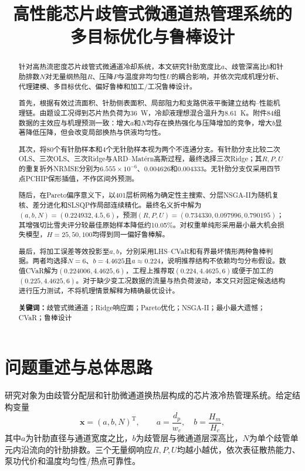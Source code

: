 \documentclass[UTF8,12pt,a4paper]{ctexart}
\title{\bfseries 高性能芯片歧管式微通道热管理系统的\\多目标优化与鲁棒设计}
\author{}
\date{}
\begin{document}
\maketitle
\vspace{-2.6em}

\begin{abstract}
针对高热流密度芯片歧管式微通道冷却系统，本文研究针肋宽度比$a$、歧管深高比$b$和针肋排数$N$对无量纲热阻$R$、压降$P$与温度非均匀性$U$的耦合影响，并依次完成机理分析、代理建模、多目标优化、偏好鲁棒和加工/工况鲁棒设计。

首先，根据有效过流面积、针肋侧表面积、局部阻力和支路供液平衡建立结构--性能机理链。由题设工况得到芯片热负荷为\SI{36}{W}，冷却液理想混合温升为\SI{8.61}{K}。附件84组数据的主效应与机理预测一致：增大$a$和$N$均存在换热强化与压降增加的竞争，增大$b$显著降低压降，但会改变局部换热与供液均匀性。

其次，将80个有针肋样本和4个无针肋样本视为两个不连通分支。有针肋分支比较二次OLS、三次OLS、三次Ridge与ARD--Mat\'ern高斯过程，最终选择三次Ridge；其$R,P,U$的重复折外NRMSE分别为$6.555\times10^{-6}$、0.004626和0.004333。无针肋分支仅采用四节点PCHIP保形插值，不作区间外预测。

随后，在Pareto偏序意义下，以401层析网格为确定性主搜索、分层NSGA-II为随机复核、差分进化和SLSQP作局部连续精化。最终名义折中解为$(a,b,N)=(0.224932,4.5,6)$，预测$(R,P,U)=(0.734330,0.097996,0.790195)$；其增强切比雪夫评分较最佳原始样本降低约10.05\%。对权重单纯形采用最小最大机会损失模型，$H=25,50,100$均得到同一偏好鲁棒解。

最后，将加工误差等效投影至$a,b$，分别采用LHS--CVaR和有界最坏情形两种鲁棒判据。两者均选择$N=6$、$b=4.4625$且$a\approx0.224$，说明推荐结构不依赖均匀分布假设。数值CVaR解为$(0.224006,4.4625,6)$，工程上推荐取$(0.224,4.4625,6)$或便于加工的$(0.225,4.4625,6)$。对于缺少变工况数据的流量与热负荷波动，本文只对固定候选结构进行压力测试，不将机理情景解释为精确最优设计。

\textbf{关键词：}歧管式微通道；Ridge响应面；Pareto优化；NSGA-II；最小最大遗憾；CVaR；鲁棒设计
\end{abstract}

\section{问题重述与总体思路}

研究对象为由歧管分配层和针肋微通道换热层构成的芯片液冷热管理系统。给定结构变量
\[
\bm x=(a,b,N)^{\mathrm T},\qquad
a=\frac{d_p}{w_c},\quad b=\frac{H_m}{H_c},
\]
其中$a$为针肋直径与通道宽度之比，$b$为歧管层与微通道层深高比，$N$为单个歧管单元内沿流向的针肋排数。三个无量纲响应$R,P,U$均越小越优，依次表征散热能力、泵功代价和温度均匀性/热点可靠性。
\end{document}
